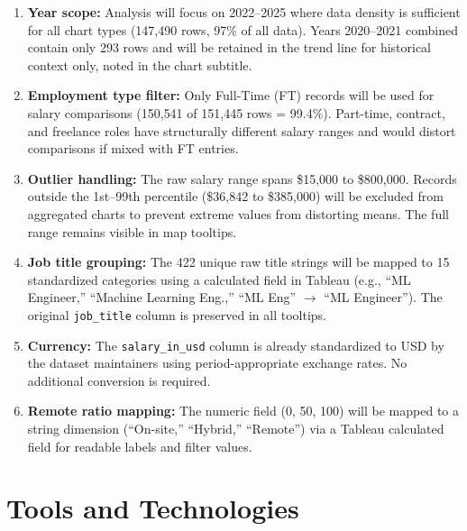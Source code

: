 \documentclass[12pt,a4paper]{article}
\begin{document}
\begin{enumerate}[leftmargin=2em, itemsep=6pt]
  \item \textbf{Year scope:} Analysis will focus on 2022--2025 where data density is
        sufficient for all chart types (147{,}490 rows, 97\% of all data). Years
        2020--2021 combined contain only 293 rows and will be retained in the trend
        line for historical context only, noted in the chart subtitle.

  \item \textbf{Employment type filter:} Only Full-Time (FT) records will be used for
        salary comparisons (150{,}541 of 151{,}445 rows = 99.4\%). Part-time,
        contract, and freelance roles have structurally different salary ranges and
        would distort comparisons if mixed with FT entries.

  \item \textbf{Outlier handling:} The raw salary range spans \$15{,}000 to
        \$800{,}000. Records outside the 1st--99th percentile (\$36{,}842 to
        \$385{,}000) will be excluded from aggregated charts to prevent extreme values
        from distorting means. The full range remains visible in map tooltips.

  \item \textbf{Job title grouping:} The 422 unique raw title strings will be mapped
        to 15 standardized categories using a calculated field in Tableau (e.g.,
        ``ML Engineer,'' ``Machine Learning Eng.,'' ``ML Eng'' $\to$ ``ML Engineer'').
        The original \texttt{job\_title} column is preserved in all tooltips.

  \item \textbf{Currency:} The \texttt{salary\_in\_usd} column is already standardized
        to USD by the dataset maintainers using period-appropriate exchange rates.
        No additional conversion is required.

  \item \textbf{Remote ratio mapping:} The numeric field (0, 50, 100) will be mapped
        to a string dimension (``On-site,'' ``Hybrid,'' ``Remote'') via a Tableau
        calculated field for readable labels and filter values.
\end{enumerate}

\section{Tools and Technologies}
\end{document}
